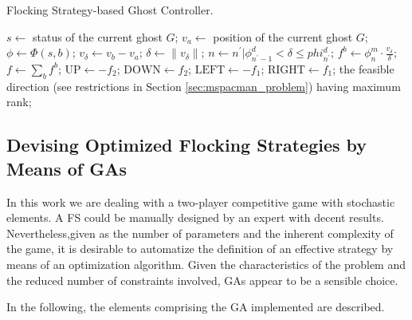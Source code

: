 \documentclass[a4paper]{llncs}
\begin{document}
\begin{algorithm}[ht]
\caption{Flocking Strategy-based Ghost Controller.}
\label{alg:FS_Controller} 
\begin{algorithmic}
\STATE $s\gets$ status of the current ghost $G$;
\STATE $v_a\gets$ position of the current ghost $G$;
	\STATE $\phi\gets\Phi(s,b)$; 
	\STATE $v_\delta\gets v_b-v_a$; 
	\STATE $\delta\gets\|v_\delta\|$; 
	\STATE $n\gets n^\prime|\phi^d_{n^\prime-1} < \delta \leq phi^d_{n^\prime}$; 
	\STATE $f^{b}\gets\phi^m_n \cdot \frac{v_\delta}{\delta}$; 
\ENDFOR
\STATE $f\gets\sum_b f^b$; 
\STATE {}
\STATE $\mathrm{UP}\gets- f_2$;
\STATE $\mathrm{DOWN}\gets f_2$;
\STATE $\mathrm{LEFT}\gets- f_1$;
\STATE $\mathrm{RIGHT}\gets f_1$;
\RETURN the feasible direction (see restrictions in Section \ref{sec:mspacman_problem}) having maximum rank;
\end{algorithmic}
\end{algorithm}


\subsection{Devising Optimized Flocking Strategies by Means of GAs}
\label{subsec:GAs_flocking}
In this work we are dealing with a two-player competitive game with stochastic elements. A FS could be manually designed by an expert with decent results. Nevertheless,given as the number of parameters and the inherent complexity of the game, it is desirable to automatize the definition of an effective strategy by means of an optimization algorithm. Given the characteristics of the problem and the reduced number of constraints involved, GAs appear to be a sensible choice. 

In the following, the elements comprising the GA implemented are described.
\end{document}
